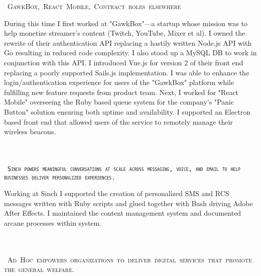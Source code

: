 \documentclass{muratcan_cv}
\begin{document}
    \mbox { \scshape \hspace{1.2em} \tiny{GawkBox, React Mobile, Contract roles elsewhere}}\\
    \indent \indent \begin{minipage}{0.96\linewidth} \footnotesize
     During this time I first worked at "GawkBox"—a startup whose mission was to help monetize streamer's content (Twitch, YouTube, Mixer et al). I owned the rewrite of their authentication API replacing a hastily written Node.js API with Go resulting in reduced code complexity. I also stood up a MySQL DB to work in conjunction with this API. I introduced Vue.js for version 2 of their front end replacing a poorly supported Sails.js implementation. I was able to enhance the login/authentication experience for users of the "GawkBox" platform while fulfilling new feature requests from product team. Next, I worked for "React Mobile" overseeing the Ruby based queue system for the company's "Panic Button" solution ensuring both uptime and availability. I supported an Electron based front end that allowed users of the service to remotely manage their wireless beacons.
    \end{minipage} \\[0.1cm]\\
    \mbox { \scshape \hspace{1.2em} \tiny{\texttt{Sinch powers meaningful conversations at scale across
    messaging, voice, and email to help businesses deliver personalized experiences.}}}\\
    \indent \indent \begin{minipage}{0.96\linewidth} \footnotesize
     Working at Sinch I supported the creation of personalized SMS and RCS messages written with Ruby scripts and glued together with Bash driving Adobe After Effects. I maintained the content management system and documented arcane processes within system.
    \end{minipage} \\[0.1cm]\\
    \mbox { \scshape \hspace{1.2em} \tiny{Ad Hoc empowers organizations to deliver digital
    services that promote the general welfare.}}\\
\end{document}
